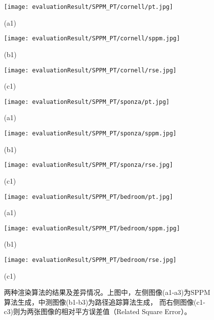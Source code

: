 \begin{figure}                 %
    \begin{minipage}{0.3\textwidth}  %
      \centerline{\texttt{[image: evaluationResult/SPPM\_PT/cornell/pt.jpg]}}
      \centerline{(a1)}
    \end{minipage}
    \hfill
    \begin{minipage}{0.3\textwidth}  %
      \centerline{\texttt{[image: evaluationResult/SPPM\_PT/cornell/sppm.jpg]}}
      \centerline{(b1)}
    \end{minipage}    
    \hfill
    \begin{minipage}{0.3\textwidth}  %
        \centerline{\texttt{[image: evaluationResult/SPPM\_PT/cornell/rse.jpg]}}
        \centerline{(c1)}
      \end{minipage}
    \vfill
    \begin{minipage}{0.3\textwidth}  %
        \centerline{\texttt{[image: evaluationResult/SPPM\_PT/sponza/pt.jpg]}}
        \centerline{(a1)}
      \end{minipage}
      \hfill
      \begin{minipage}{0.3\textwidth}  %
        \centerline{\texttt{[image: evaluationResult/SPPM\_PT/sponza/sppm.jpg]}}
        \centerline{(b1)}
      \end{minipage}    
      \hfill
      \begin{minipage}{0.3\textwidth}  %
          \centerline{\texttt{[image: evaluationResult/SPPM\_PT/sponza/rse.jpg]}}
          \centerline{(c1)}
        \end{minipage}
      \vfill
      \begin{minipage}{0.3\textwidth}  %
        \centerline{\texttt{[image: evaluationResult/SPPM\_PT/bedroom/pt.jpg]}}
        \centerline{(a1)}
      \end{minipage}
      \hfill
      \begin{minipage}{0.3\textwidth}  %
        \centerline{\texttt{[image: evaluationResult/SPPM\_PT/bedroom/sppm.jpg]}}
        \centerline{(b1)}
      \end{minipage}    
      \hfill
      \begin{minipage}{0.3\textwidth}  %
          \centerline{\texttt{[image: evaluationResult/SPPM\_PT/bedroom/rse.jpg]}}
          \centerline{(c1)}
        \end{minipage}
      \vfill
    \caption{两种渲染算法的结果及差异情况。上图中，左侧图像(a1-a3)为SPPM算法生成，中测图像(b1-b3)为路径追踪算法生成，
    而右侧图像(c1-c3)则为两张图像的相对平方误差值（Related Square Error）。}
    \label{fig:lab2image}
\end{figure}

